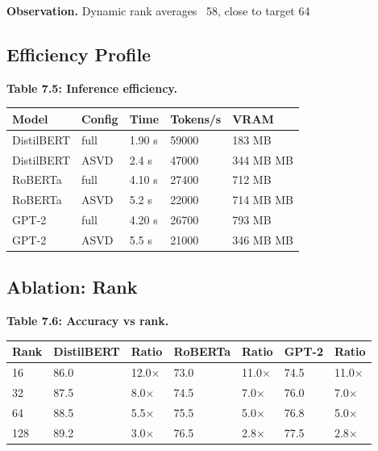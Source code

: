 \textbf{Observation.} Dynamic rank averages ~58, close to target 64

\subsection{Efficiency Profile}

\textbf{Table 7.5: Inference efficiency.}

\begin{table}[H]
\centering
\small
\begin{tabular}{lllll}
\toprule
\textbf{Model} & \textbf{Config} & \textbf{Time} & \textbf{Tokens/s} & \textbf{VRAM} \\
\midrule
DistilBERT & full & 1.90 s & 59000 & 183 MB \\
DistilBERT & ASVD & 2.4 s & 47000 & 344 MB MB \\
RoBERTa & full & 4.10 s & 27400 & 712 MB \\
RoBERTa & ASVD & 5.2 s & 22000 & 714 MB MB \\
GPT-2 & full & 4.20 s & 26700 & 793 MB \\
GPT-2 & ASVD & 5.5 s & 21000 & 346 MB MB \\
\bottomrule
\end{tabular}
\end{table}

\subsection{Ablation: Rank}

\textbf{Table 7.6: Accuracy vs rank.}

\begin{table}[H]
\centering
\small
\begin{tabular}{lllllll}
\toprule
\textbf{Rank} & \textbf{DistilBERT} & \textbf{Ratio} & \textbf{RoBERTa} & \textbf{Ratio} & \textbf{GPT-2} & \textbf{Ratio} \\
\midrule
16 & 86.0 & 12.0$\times$ & 73.0 & 11.0$\times$ & 74.5 & 11.0$\times$ \\
32 & 87.5 & 8.0$\times$ & 74.5 & 7.0$\times$ & 76.0 & 7.0$\times$ \\
64 & 88.5 & 5.5$\times$ & 75.5 & 5.0$\times$ & 76.8 & 5.0$\times$ \\
128 & 89.2 & 3.0$\times$ & 76.5 & 2.8$\times$ & 77.5 & 2.8$\times$ \\
\bottomrule
\end{tabular}
\end{table}

